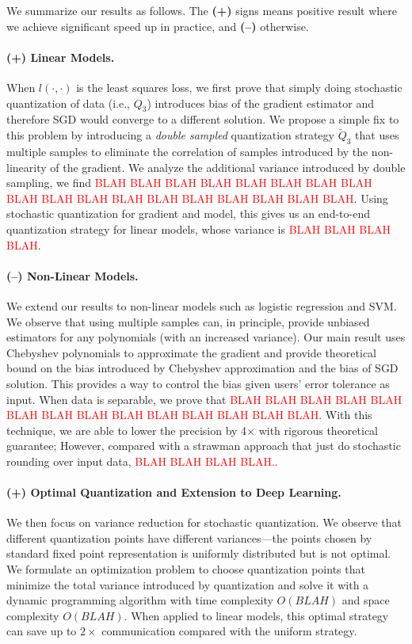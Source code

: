 \documentclass{article}
\begin{document}
We summarize our results as follows. The {\bf (+)}
signs means positive result where we achieve
significant speed up in practice, and {\bf (--)} otherwise.

\paragraph{(+) Linear Models.} When $l(\cdot,\cdot)$ is 
the least squares loss, we first prove that
simply doing stochastic quantization of data 
(i.e., $Q_3$) introduces bias of the gradient
estimator and therefore SGD would converge
to a different solution. We propose a simple
fix to this problem by introducing a
{\em double sampled} quantization strategy
$\tilde{Q}_3$ that uses multiple samples to
eliminate the correlation of samples introduced
by the non-linearity of the gradient. We
analyze the additional variance introduced
by double sampling, we find \textcolor{red}{
BLAH BLAH BLAH BLAH BLAH BLAH BLAH BLAH BLAH BLAH BLAH BLAH
BLAH BLAH BLAH BLAH BLAH BLAH}. Using
stochastic quantization for gradient and model,
this gives us an end-to-end quantization strategy
for linear models, whose variance is \textcolor{red}{
BLAH BLAH BLAH BLAH}.

\vspace{-1em}
\paragraph{(--) Non-Linear Models.} We extend our
results to non-linear models such as
logistic regression and SVM. We observe that
using multiple samples can, in principle,
provide unbiased estimators for any polynomials
(with an increased variance). Our main
result uses Chebyshev polynomials to
approximate the gradient and provide theoretical
bound on the bias introduced by Chebyshev
approximation and the bias of SGD solution. 
This provides a way to control the bias given
users' error tolerance as input.  
When data is separable,
we prove that \textcolor{red}{BLAH BLAH 
BLAH BLAH BLAH BLAH BLAH BLAH BLAH BLAH BLAH 
BLAH BLAH BLAH}. With this technique, we are
able to lower the precision by 4$\times$ with
rigorous theoretical guarantee; However,
compared with a strawman approach that just
do stochastic rounding over input data, 
\textcolor{red}{BLAH BLAH BLAH BLAH.}.

\vspace{-1em}
\paragraph{(+) Optimal Quantization and Extension to Deep Learning.}
We then focus on variance reduction for 
stochastic quantization. We observe that different
quantization points have different variances---the points chosen
by standard fixed point representation is uniformly
distributed but is not optimal.
We formulate an optimization problem to choose 
quantization points that minimize the total variance
introduced by quantization and solve it with 
a dynamic programming algorithm with time complexity
$O(BLAH)$ and space complexity $O(BLAH)$.
When applied to linear models, this optimal 
strategy can save up to $2\times$ communication
compared with the uniform strategy.
\end{document}
